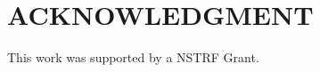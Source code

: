\documentclass[letterpaper, 10 pt, conference]{ieeeconf}  %
\begin{document}
   


\addtolength{\textheight}{-12cm}   %








\section*{ACKNOWLEDGMENT}
This work was supported by a NSTRF Grant.







\end{document}

